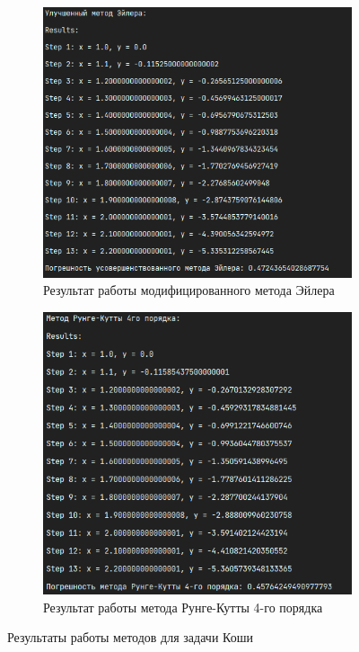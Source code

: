 \documentclass[12pt]{article}
\begin{document}
\begin{figure}[ht]
\begin{subfigure}{0.4\textwidth}
            \includegraphics[width=\linewidth]{image/modified_euler_method}
            \caption{Результат работы модифицированного метода Эйлера}
        \end{subfigure}
        \hfill
        \begin{subfigure}{0.4\textwidth}
            \includegraphics[width=\linewidth]{image/runge_kutta_method}
            \caption{Результат работы метода Рунге-Кутты 4-го порядка}
        \end{subfigure}
        \caption{Результаты работы методов для задачи Коши}
    \end{figure}
\end{document}
